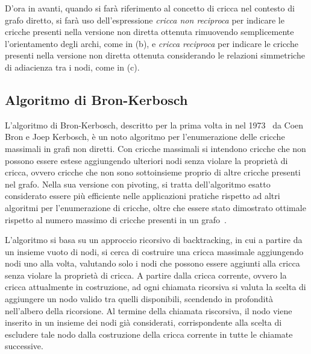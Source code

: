 D'ora in avanti, quando si far\`a riferimento al concetto di cricca nel contesto di grafo diretto, si far\`a
uso dell'espressione \textit{cricca non reciproca} per indicare le cricche presenti nella versione non diretta
ottenuta rimuovendo semplicemente l'orientamento degli archi, come in (b), e \textit{cricca reciproca} per indicare
le cricche presenti nella versione non diretta ottenuta considerando le relazioni simmetriche di adiacienza tra i nodi,
come in (c).


\subsection{Algoritmo di Bron-Kerbosch}\label{subsec:bronkerbosh}

L'algoritmo di Bron-Kerbosch, descritto per la prima volta in nel 1973~\cite{10.1145/362342.362367} da
Coen Bron e Joep Kerbosch, \`e un noto algoritmo per l'enumerazione delle cricche massimali in grafi non diretti.
Con cricche massimali si intendono cricche che non possono essere estese aggiungendo ulteriori nodi senza
violare la propriet\`a di cricca, ovvero cricche che non sono sottoinsieme proprio di altre cricche presenti nel grafo.
Nella sua versione con pivoting, si tratta dell'algoritmo esatto considerato essere pi\`u efficiente nelle applicazioni
pratiche rispetto ad altri algoritmi per l'enumerazione di cricche, oltre che essere stato dimostrato ottimale
rispetto al numero massimo di cricche presenti in un grafo~\cite{TOMITA200628}. \newline

L'algoritmo si basa su un approccio ricorsivo di backtracking, in cui a partire da un insieme vuoto di nodi, si
cerca di costruire una cricca massimale aggiungendo nodi uno alla volta, valutando solo i nodi che
possono essere aggiunti alla cricca senza violare la propriet\`a di cricca.
A partire dalla cricca corrente, ovvero la cricca attualmente in costruzione, ad ogni chiamata ricorsiva si valuta
la scelta di aggiungere un nodo valido tra quelli disponibili, scendendo in profondit\`a nell'albero della ricorsione.
Al termine della chiamata riscorsiva, il nodo viene inserito in un insieme dei nodi
gi\`a considerati, corrispondente alla scelta di escludere tale nodo dalla costruzione della cricca corrente in tutte
le chiamate successive. \newline



